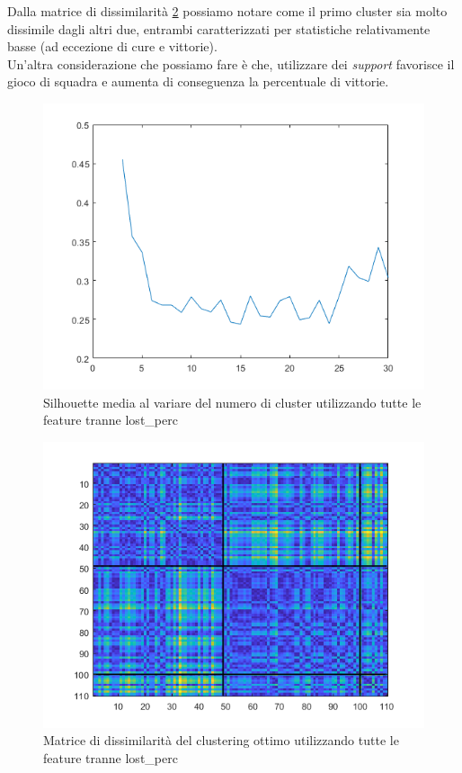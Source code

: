 \documentclass[a4paper,12pt,openany,oneside]{book}
\begin{document}
Dalla matrice di dissimilarità \ref{fig:diss-mat_3} possiamo notare come il primo cluster sia molto dissimile dagli altri due, entrambi caratterizzati per statistiche relativamente basse (ad eccezione di cure e vittorie).\\
Un'altra considerazione che possiamo fare è che, utilizzare dei \textit{support} favorisce il gioco di squadra e aumenta di conseguenza la percentuale di vittorie.

\begin{figure}[H]
	\centering
	\includegraphics[width=0.8\linewidth]{pics/no11/chooseK.png}
	\caption{Silhouette media al variare del numero di cluster utilizzando tutte le feature tranne lost\_perc}
	\label{fig:chooseK_3}
\end{figure}
\begin{figure}[H]
	\centering
	\includegraphics[width=0.8\linewidth]{pics/no11/diss_mat.png}
	\caption{Matrice di dissimilarità del clustering ottimo utilizzando tutte le feature tranne lost\_perc}
	\label{fig:diss-mat_3}
\end{figure}
\end{document}
